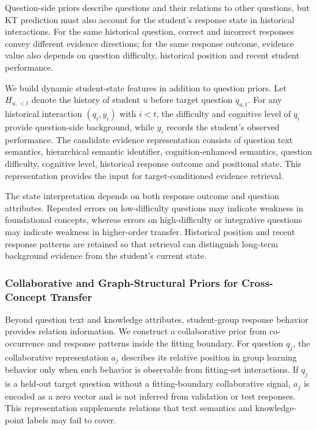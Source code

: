 \documentclass[a4paper,12pt]{article}
\numberwithin{table}{section}
\begin{document}
Question-side priors describe questions and their relations to other questions, but KT prediction must also account for the student's response state in historical interactions. For the same historical question, correct and incorrect responses convey different evidence directions; for the same response outcome, evidence value also depends on question difficulty, historical position and recent student performance.

We build dynamic student-state features in addition to question priors. Let \(H_{u,<t}\) denote the history of student \(u\) before target question \(q_{u,t}\). For any historical interaction \((q_i,y_i)\) with \(i<t\), the difficulty and cognitive level of \(q_i\) provide question-side background, while \(y_i\) records the student's observed performance. The candidate evidence representation consists of question text semantics, hierarchical semantic identifier, cognition-enhanced semantics, question difficulty, cognitive level, historical response outcome and positional state. This representation provides the input for target-conditioned evidence retrieval.

The state interpretation depends on both response outcome and question attributes. Repeated errors on low-difficulty questions may indicate weakness in foundational concepts, whereas errors on high-difficulty or integrative questions may indicate weakness in higher-order transfer. Historical position and recent response patterns are retained so that retrieval can distinguish long-term background evidence from the student's current state.

\subsubsection{Collaborative and Graph-Structural Priors for Cross-Concept Transfer}

Beyond question text and knowledge attributes, student-group response behavior provides relation information. We construct a collaborative prior from co-occurrence and response patterns inside the fitting boundary. For question \(q_j\), the collaborative representation \(a_j\) describes its relative position in group learning behavior only when such behavior is observable from fitting-set interactions. If \(q_j\) is a held-out target question without a fitting-boundary collaborative signal, \(a_j\) is encoded as a zero vector and is not inferred from validation or test responses. This representation supplements relations that text semantics and knowledge-point labels may fail to cover.
\end{document}
